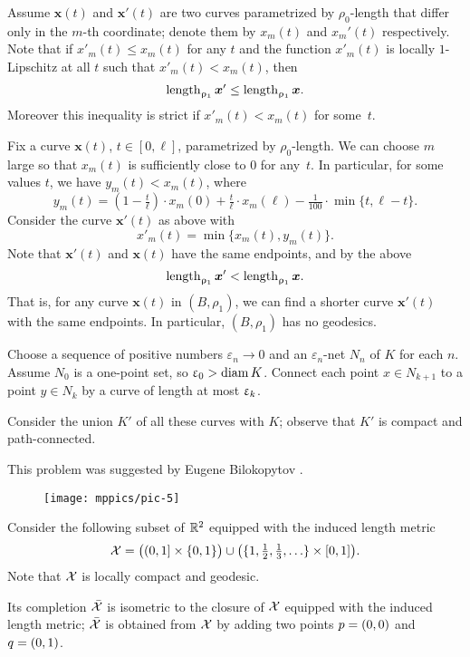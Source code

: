 Assume $\bm{x}(t)$ and $\bm{x}'(t)$ are two curves parametrized by $\rho_0$-length that differ only in the $m$-th coordinate; denote them by $x_m(t)$ and $x_m'(t)$ respectively.
Note that if $x'_m(t)\le x_m(t)$ for any $t$ and 
the function $x'_m(t)$ is locally $1$-Lipschitz at all $t$ such that $x'_m(t)< x_m(t)$, then 
\[\length_{\rho_1}\bm{x}'\le \length_{\rho_1}\bm{x}.\]
Moreover this inequality is strict if $x'_m(t)< x_m(t)$ for some~$t$.

Fix a curve $\bm{x}(t)$, $t\in[0,\ell]$, parametrized by  $\rho_0$-length.
We can choose $m$ large so that $x_m(t)$ is sufficiently close to $0$ for any~$t$.
In particular, for some values $t$, we have $y_m(t)<x_m(t)$, where
\[y_m(t)=(1-\tfrac t\ell)\cdot x_m(0)
+\tfrac t\ell\cdot x_m(\ell)
-\tfrac 1{100}\cdot \min\{t,\ell-t\}.\]
Consider the curve $\bm{x}'(t)$ as above with
\[x'_m(t)=\min\{x_m(t),y_m(t)\}.\]
Note that $\bm{x}'(t)$ and $\bm{x}(t)$ have the same endpoints, and by the above
\[\mathop{\rm length}\nolimits_{\upvarrho_1}\bm{x}'<\mathop{\rm length}\nolimits_{\upvarrho_1}\bm{x}.\]
That is, for any curve $\bm{x}(t)$ in $(B,\rho_1)$, we can find a shorter curve $\bm{x}'(t)$ with the same endpoints.
In particular, $(B,\rho_1)$ has no geodesics.

Choose a sequence of positive numbers $\varepsilon_n\to 0$ and an $\varepsilon_n$-net $N_n$ of $K$ for each $n$.
Assume $N_0$ is a one-point set, so $\upvarepsilon_0>\mathop{\rm diam}\nolimits K$.
Connect each point $x\in N_{k+1}$ to a point $y\in N_{k}$ by a curve of length at most $\upvarepsilon_k$.

Consider the union $K'$ of all these curves with $K$; observe that $K'$ is compact and path-connected.

 This problem was suggested by Eugene Bilokopytov \cite{bilokopytov}.

\begin{wrapfigure}{r}{20 mm}
\vskip-4mm
\centering
\texttt{[image: mppics/pic-5]}
\end{wrapfigure}

Consider the following subset of $\mathbb{R}^2$ equipped with the induced length metric
\[
\spc{X}
=
\bigl((0,1]\times\{0,1\}\bigr)
\cup
\bigl(\{1,\tfrac12,\tfrac13,\dots\}\times[0,1]\bigr).
\]
Note that $\mathcal{X}$ is locally compact and geodesic.

Its completion $\bar{\mathcal{X}}$ is isometric to the closure of $\mathcal{X}$ equipped with the induced length metric;
$\bar{\mathcal{X}}$ is obtained from $\mathcal{X}$ by adding two points $p\z=(0,0)$ and $q\z=(0,1)$.

